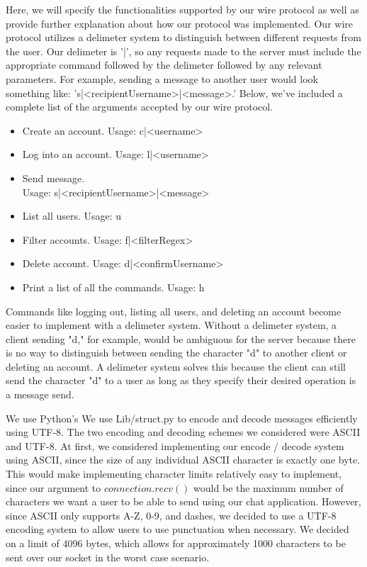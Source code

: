 \documentclass[
	a4paper, %
	10pt, %
	unnumberedsections, %
	twoside, %
]{LTJournalArticle}
\begin{document}
Here, we will specify the functionalities supported by our wire protocol as well as provide further explanation about how our protocol was implemented. Our wire protocol utilizes a delimeter system to distinguish between different requests from the user. Our delimeter is '|', so any requests made to the server must include the appropriate command followed by the delimeter followed by any relevant parameters. For example, sending a message to another user would look something like: 's|<recipientUsername>|<message>.' Below, we've included a complete list of the arguments accepted by our wire protocol. 
\begin{itemize}
    \item Create an account. Usage: c|<username>
    \item Log into an account. Usage: l|<username>
    \item Send message. \\
    Usage: s|<recipientUsername>|<message>
    \item List all users. Usage: u
    \item Filter accounts. Usage: f|<filterRegex>
    \item Delete account. Usage: d|<confirmUsername>
    \item Print a list of all the commands. Usage: h
\end{itemize}

Commands like logging out, listing all users, and deleting an account become easier to implement with a delimeter system. Without a delimeter system, a client sending "d," for example, would be ambiguous for the server because there is no way to distinguish between sending the character "d" to another client or deleting an account. A delimeter system solves this because the client can still send the character "d" to a user as long as they specify their desired operation is a message send. 

We use Python's We use Lib/struct.py to encode and decode messages efficiently using UTF-8. The two encoding and decoding schemes we considered were ASCII and UTF-8. At first, we considered implementing our encode / decode system using ASCII, since the size of any individual ASCII character is exactly one byte. This would make implementing character limits relatively easy to implement, since our argument to $connection.recv()$ would be the maximum number of characters we want a user to be able to send using our chat application. However, since ASCII only supports A-Z, 0-9, and dashes, we decided to use a UTF-8 encoding system to allow users to use punctuation when necessary. We decided on a limit of 4096 bytes, which allows for approximately 1000 characters to be sent over our socket in the worst case scenario. 
\end{document}
